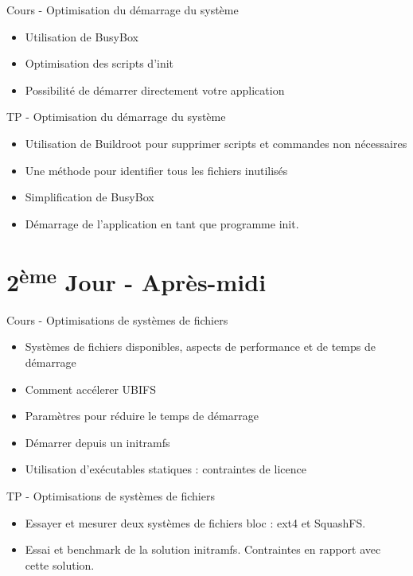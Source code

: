 \documentclass[a4paper,12pt,obeyspaces,spaces,hyphens]{article}
\begin{document}
\feagendatwocolumn
{Cours - Optimisation du démarrage du système}
{
  \begin{itemize}
  \item Utilisation de BusyBox 
  \item Optimisation des scripts d'init
  \item Possibilité de démarrer directement votre application
  \end{itemize}
}
{TP - Optimisation du démarrage du système}
{
 \begin{itemize}
 \item Utilisation de Buildroot pour supprimer scripts et commandes non nécessaires
 \item Une méthode pour identifier tous les fichiers inutilisés
 \item Simplification de BusyBox
 \item Démarrage de l'application en tant que programme init.
 \end{itemize}
}

\section{2\textsuperscript{ème} Jour - Après-midi}

\feagendatwocolumn
{Cours - Optimisations de systèmes de fichiers}
{
  \begin{itemize}
  \item Systèmes de fichiers disponibles, aspects de performance et de temps de démarrage
  \item Comment accélerer UBIFS
  \item Paramètres pour réduire le temps de démarrage
  \item Démarrer depuis un initramfs
  \item Utilisation d'exécutables statiques : contraintes de licence
  \end{itemize}
}
{TP - Optimisations de systèmes de fichiers}
{
 \begin{itemize}
 \item Essayer et mesurer deux systèmes de fichiers bloc : ext4 et SquashFS.
 \item Essai et benchmark de la solution initramfs. Contraintes
       en rapport avec cette solution.
 \end{itemize}
}
\end{document}
